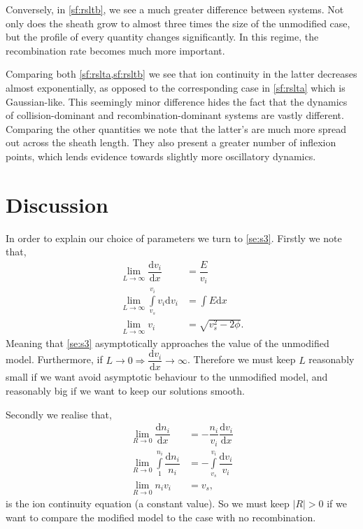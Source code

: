 \documentclass[aip,apl,reprint]{revtex4-1}
\newcommand{\difx}[1]{\dfrac{\mathrm{d}#1}{\mathrm{d}x}}
\begin{document}
	Conversely, in \cref{sf:rsltb}, we see a much greater difference between systems. Not only does the sheath grow to almost three times the size of the unmodified case, but the profile of every quantity changes significantly. In this regime, the recombination rate becomes much more important. 
	
	Comparing both \cref{sf:rslta,sf:rsltb} we see that ion continuity in the latter decreases almost exponentially, as opposed to the corresponding case in \cref{sf:rslta} which is Gaussian-like. This seemingly minor difference hides the fact that the dynamics of collision-dominant and recombination-dominant systems are vastly different. Comparing the other quantities we note that the latter's are much more spread out across the sheath length. They also present a greater number of inflexion points, which lends evidence towards slightly more oscillatory dynamics.
	
	\section{Discussion}\label{s:discussion}
	In order to explain our choice of parameters we turn to \cref{se:s3}. Firstly we note that,
	\begin{subequations}
		\begin{align}
			\lim\limits_{L \to \infty} \difx{v_{i}} &= \dfrac{E}{v_{i}}\\
			\lim\limits_{L \to \infty} \int\limits_{v_{s}}^{v_{i}} v_{i} \mathrm{d}v_{i} &= \int E \mathrm{d}x\\
			\lim\limits_{L \to \infty} v_{i} &= \sqrt{v_{s}^{2} - 2\phi}.\label{se:vi}
		\end{align}
	\end{subequations}
	Meaning that \cref{se:s3} asymptotically approaches the value of the unmodified model. Furthermore, if $L \to 0 \Rightarrow \difx{v_{i}} \to \infty$. Therefore we must keep $L$ reasonably small if we want avoid asymptotic behaviour to the unmodified model, and reasonably big if we want to keep our solutions smooth.
	
	Secondly we realise that,
	\begin{subequations}
		\begin{align}
			\lim\limits_{R \to 0} \difx{n_{i}} &= -\dfrac{n_{i}}{v_{i}} \difx{v_{i}} \\
			\lim\limits_{R \to 0} \int\limits_{1}^{n_{i}}\dfrac{\mathrm{d} n_{i}}{n_{i}} &= -\int\limits_{v_{s}}^{v_{i}}\dfrac{\mathrm{d} v_{i}}{v_{i}}\\
			\lim\limits_{R \to 0} n_{i}v_{i} &= v_{s}, \label{s:cont}
		\end{align}
	\end{subequations}
	is the ion continuity equation (a constant value). So we must keep $|R| > 0$ if we want to compare the modified model to the case with no recombination. 
	
\end{document}
